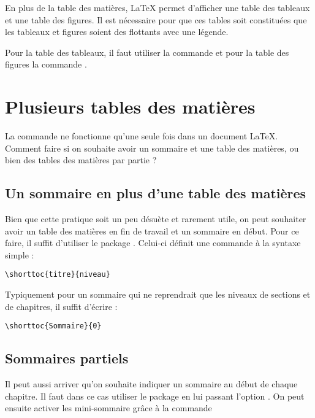 En plus de la table des matières, \LaTeX{} permet d'afficher une table des tableaux et une table des figures. Il est nécessaire pour que ces tables soit constituées que les tableaux et figures soient des flottants avec une légende. 

Pour la table des tableaux, il faut utiliser la commande  et pour la table des figures la commande .



\section{Plusieurs tables des matières}

La commande  ne fonctionne qu'une seule fois dans un document \LaTeX{}. Comment faire si on souhaite avoir un sommaire et une table des matières, ou bien des tables des matières par partie ?

\subsection{Un sommaire en plus d'une table des matières}

Bien que cette pratique soit un peu désuète et rarement utile, on peut souhaiter  avoir un table des matières en fin de travail et un sommaire en début.
Pour ce faire, il suffit d'utiliser le package . Celui-ci définit une commande  à la syntaxe simple :

\begin{verbatim}
\shorttoc{titre}{niveau}
\end{verbatim}

Typiquement pour un sommaire qui ne reprendrait que les niveaux de sections et de chapitres, il suffit d'écrire :

\begin{verbatim}
\shorttoc{Sommaire}{0}
\end{verbatim}




\subsection{Sommaires partiels}

Il peut aussi arriver qu'on souhaite indiquer un sommaire au début de chaque chapitre. Il faut dans ce cas utiliser le package  en lui passant l'option . On peut ensuite activer les mini-sommaire grâce à la commande 

